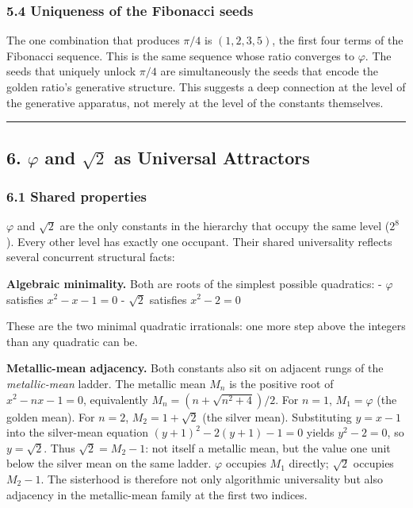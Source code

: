 \documentclass[
  11pt,
  letterpaper,
]{article}
\begin{document}
\subsubsection{5.4 Uniqueness of the Fibonacci
seeds}\label{uniqueness-of-the-fibonacci-seeds}

The one combination that produces \(\pi/4\) is \((1, 2, 3, 5)\), the
first four terms of the Fibonacci sequence. This is the same sequence
whose ratio converges to \(\varphi\). The seeds that uniquely unlock
\(\pi/4\) are simultaneously the seeds that encode the golden ratio's
generative structure. This suggests a deep connection at the level of
the generative apparatus, not merely at the level of the constants
themselves.

\begin{center}\rule{0.5\linewidth}{0.5pt}\end{center}

\subsection{\texorpdfstring{6. \(\varphi\) and \(\sqrt{2}\) as Universal
Attractors}{6. \textbackslash varphi and \textbackslash sqrt\{2\} as Universal Attractors}}\label{varphi-and-sqrt2-as-universal-attractors}

\subsubsection{6.1 Shared properties}\label{shared-properties}

\(\varphi\) and \(\sqrt{2}\) are the only constants in the hierarchy
that occupy the same level (\(2^8\)). Every other level has exactly one
occupant. Their shared universality reflects several concurrent
structural facts:

\textbf{Algebraic minimality.} Both are roots of the simplest possible
quadratics: - \(\varphi\) satisfies \(x^2 - x - 1 = 0\) - \(\sqrt{2}\)
satisfies \(x^2 - 2 = 0\)

These are the two minimal quadratic irrationals: one more step above the
integers than any quadratic can be.

\textbf{Metallic-mean adjacency.} Both constants also sit on adjacent
rungs of the \emph{metallic-mean} ladder. The metallic mean \(M_n\) is
the positive root of \(x^2 - nx - 1 = 0\), equivalently
\(M_n = (n + \sqrt{n^2 + 4})/2\). For \(n = 1\), \(M_1 = \varphi\) (the
golden mean). For \(n = 2\), \(M_2 = 1 + \sqrt{2}\) (the silver mean).
Substituting \(y = x - 1\) into the silver-mean equation
\((y+1)^2 - 2(y+1) - 1 = 0\) yields \(y^2 - 2 = 0\), so
\(y = \sqrt{2}\). Thus \(\sqrt{2} = M_2 - 1\): not itself a metallic
mean, but the value one unit below the silver mean on the same ladder.
\(\varphi\) occupies \(M_1\) directly; \(\sqrt{2}\) occupies
\(M_2 - 1\). The sisterhood is therefore not only algorithmic
universality but also adjacency in the metallic-mean family at the first
two indices.
\end{document}
